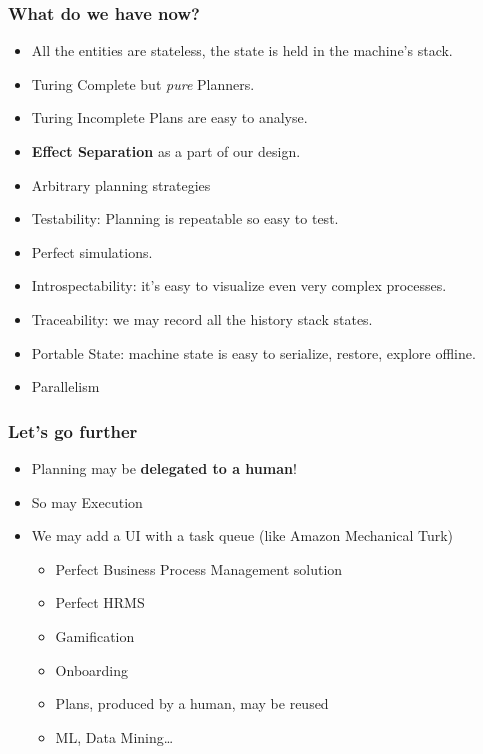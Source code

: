 \documentclass{beamer}
\begin{document}
\begin{frame}
    \frametitle{What do we have now?}  
\begin{itemize}
    \item All the entities are stateless, the state is held in the machine's stack.
    \item Turing Complete but \textit{pure} Planners.
    \item Turing Incomplete Plans are easy to analyse.
    \item \textbf{Effect Separation} as a part of our design.
    \item Arbitrary planning strategies  
    \item Testability: Planning is repeatable so easy to test.
    \item Perfect simulations.
    \item Introspectability: it's easy to visualize even very complex processes.
    \item Traceability: we may record all the history stack states.
    \item Portable State: machine state is easy to serialize, restore, explore offline. 
    \item Parallelism
\end{itemize}
\end{frame}

\begin{frame}
    \frametitle{Let's go further}  
\begin{itemize}
    \item Planning may be \textbf{delegated to a human}!
    \item So may Execution
    \item We may add a UI with a task queue (like Amazon Mechanical Turk)
    \begin{itemize}
        \item Perfect Business Process Management solution
        \item Perfect HRMS
        \item Gamification
        \item Onboarding
        \item Plans, produced by a human, may be reused
        \item ML, Data Mining\dots
    \end{itemize}   
\end{itemize}
\end{frame}
\end{document}
